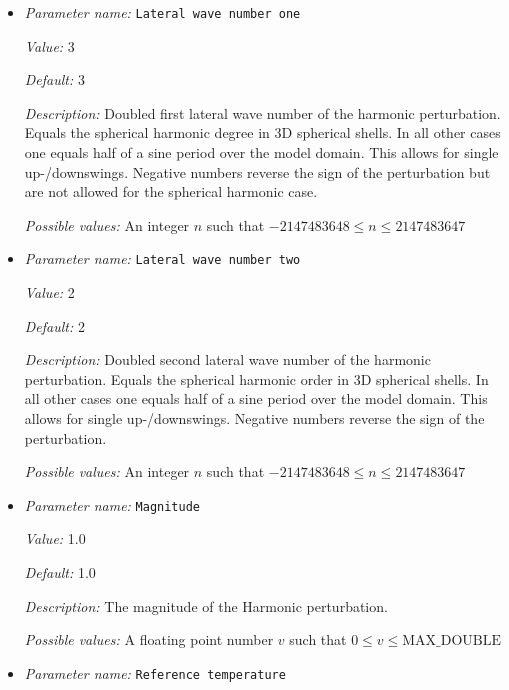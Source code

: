 \begin{itemize}
\item {\it Parameter name:} {\tt Lateral wave number one}
\label{parameters:Initial temperature model/Harmonic perturbation/Lateral wave number one}


{\it Value:} 3


{\it Default:} 3


{\it Description:} Doubled first lateral wave number of the harmonic perturbation. Equals the spherical harmonic degree in 3D spherical shells. In all other cases one equals half of a sine period over the model domain. This allows for single up-/downswings. Negative numbers reverse the sign of the perturbation but are not allowed for the spherical harmonic case.


{\it Possible values:} An integer $n$ such that $-2147483648\leq n \leq 2147483647$
\item {\it Parameter name:} {\tt Lateral wave number two}
\label{parameters:Initial temperature model/Harmonic perturbation/Lateral wave number two}


{\it Value:} 2


{\it Default:} 2


{\it Description:} Doubled second lateral wave number of the harmonic perturbation. Equals the spherical harmonic order in 3D spherical shells. In all other cases one equals half of a sine period over the model domain. This allows for single up-/downswings. Negative numbers reverse the sign of the perturbation.


{\it Possible values:} An integer $n$ such that $-2147483648\leq n \leq 2147483647$
\item {\it Parameter name:} {\tt Magnitude}
\label{parameters:Initial temperature model/Harmonic perturbation/Magnitude}


{\it Value:} 1.0


{\it Default:} 1.0


{\it Description:} The magnitude of the Harmonic perturbation.


{\it Possible values:} A floating point number $v$ such that $0 \leq v \leq \text{MAX\_DOUBLE}$
\item {\it Parameter name:} {\tt Reference temperature}
\label{parameters:Initial temperature model/Harmonic perturbation/Reference temperature}



\end{itemize}
